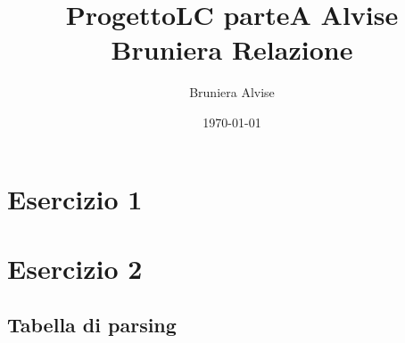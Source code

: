 \documentclass[11pt, a4paper]{article}
\title{ProgettoLC parteA Alvise Bruniera Relazione}
\author{Bruniera Alvise}
\affil{Università degli studi di Udine}
\date{\today}
\begin{document}
\maketitle

\newpage

\tableofcontents

\newpage

\section{Esercizio 1}

\section{Esercizio 2}

\subsection{Tabella di parsing}
\end{document}
